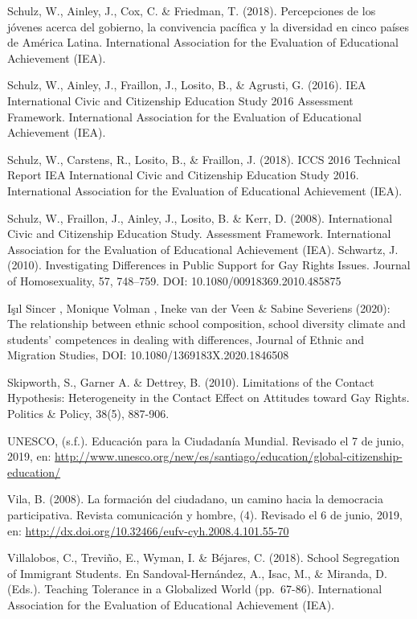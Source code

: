 \documentclass[12pt,twoside]{templates/facsothesis}
\begin{document}
Schulz, W., Ainley, J., Cox, C. \& Friedman, T. (2018). Percepciones de los jóvenes acerca del gobierno, la convivencia pacífica y la diversidad en cinco países de América Latina. International Association for the Evaluation of Educational Achievement (IEA).

Schulz, W., Ainley, J., Fraillon, J., Losito, B., \& Agrusti, G. (2016). IEA International Civic and Citizenship Education Study 2016 Assessment Framework. International Association for the Evaluation of Educational Achievement (IEA).

Schulz, W., Carstens, R., Losito, B., \& Fraillon, J. (2018). ICCS 2016 Technical Report IEA International Civic and Citizenship Education Study 2016. International Association for the Evaluation of Educational Achievement (IEA).

Schulz, W., Fraillon, J., Ainley, J., Losito, B. \& Kerr, D. (2008). International Civic and Citizenship Education Study. Assessment Framework. International Association for the Evaluation of Educational Achievement (IEA).
Schwartz, J. (2010). Investigating Differences in Public Support for Gay Rights Issues. Journal of Homosexuality, 57, 748--759. DOI: 10.1080/00918369.2010.485875

Işıl Sincer , Monique Volman , Ineke van der Veen \& Sabine Severiens (2020): The relationship between ethnic school composition, school diversity climate and students' competences in dealing with differences, Journal of Ethnic and Migration Studies, DOI: 10.1080/1369183X.2020.1846508

Skipworth, S., Garner A. \& Dettrey, B. (2010). Limitations of the Contact Hypothesis: Heterogeneity in the Contact Effect on Attitudes toward Gay Rights. Politics \& Policy, 38(5), 887-906.

UNESCO, (s.f.). Educación para la Ciudadanía Mundial. Revisado el 7 de junio, 2019, en: \url{http://www.unesco.org/new/es/santiago/education/global-citizenship-education/}

Vila, B. (2008). La formación del ciudadano, un camino hacia la democracia participativa. Revista comunicación y hombre, (4). Revisado el 6 de junio, 2019, en: \url{http://dx.doi.org/10.32466/eufv-cyh.2008.4.101.55-70}

Villalobos, C., Treviño, E., Wyman, I. \& Béjares, C. (2018). School Segregation of Immigrant Students. En Sandoval-Hernández, A., Isac, M., \& Miranda, D. (Eds.). Teaching Tolerance in a Globalized World (pp.~67-86). International Association for the Evaluation of Educational Achievement (IEA).



\end{document}
